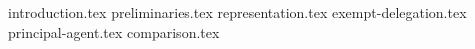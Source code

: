 {introduction.tex}
{preliminaries.tex}
{representation.tex}
{exempt-delegation.tex}
{principal-agent.tex}
{comparison.tex}
